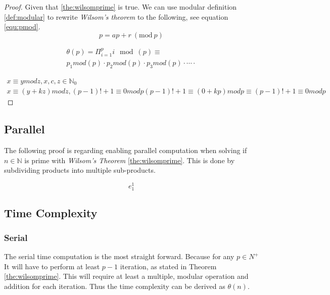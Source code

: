 \documentclass[12pt, oneside, onecolumn]{article}
\newcommand{\Mod}[1]{\ (\mathrm{mod}\ #1)}
\begin{document}
\begin{proof}
Given that \ref{the:wilsomprime} is true. We can use modular definition \ref{def:modular} to rewrite \emph{Wilsom's theorem} to the following, see equation \ref{equ:pmod}.
%
\begin{equation}\label{equ:pmod}
p = ap + r \Mod{p}
\end{equation}

%
\begin{equation}\label{equ:}
\begin{split}
\theta(p) = \Pi_{i = 1}^{p} i\mod(p)	\!
\equiv									\\
p_1mod(p)\cdot p_2mod(p) \cdot p_3mod(p) \cdot\cdots\cdot
\end{split}
\end{equation}

%
\begin{equation}
\begin{split}
x\equiv ymodz, x,c,z \in \mathbb{N}_{0} \\
x\equiv (y + kz)mod z,						
(p -1)!+1\equiv0modp
(p-1)!+1\equiv(0+kp)modp
\equiv (p-1)!+1\equiv 0 mod p
\end{split}
\end{equation}

\end{proof}

% 
\subsection{Parallel}
The following proof is regarding enabling parallel computation when solving if $n \in \mathbb{N}$ is prime with \emph{Wilsom's Theorem} \ref{the:wilsomprime}. This is done by subdividing products into multiple sub-products.

\begin{equation}
e_{1}^{1}
\end{equation}

%
\subsection{Time Complexity}
\subsubsection{Serial}\label{sec:time:serial}
The serial time computation is the most straight forward. Because for any $p \in{N}^+$ It will have to perform at least $p - 1$ iteration, as stated in Theorem \ref{the:wilsomprime}. This will require at least a multiple, modular operation and addition for each iteration. Thus the time complexity can be derived as $\theta(n)$.
\end{document}
